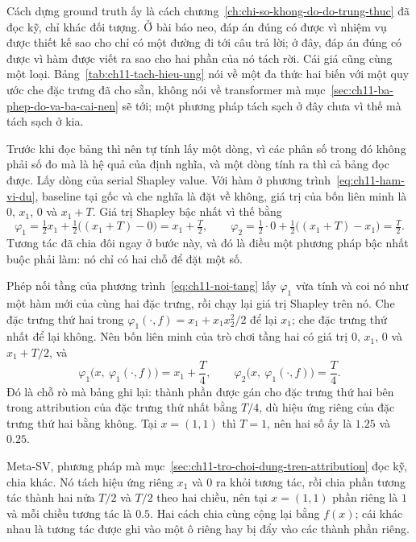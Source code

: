 Cách dựng ground truth ấy là cách chương~\ref{ch:chi-so-khong-do-do-trung-thuc}
đã đọc kỹ, chỉ khác đối tượng. Ở bài báo neo, đáp án đúng có được vì nhiệm vụ
được thiết kế sao cho chỉ có một đường đi tới câu trả lời; ở đây, đáp án đúng có
được vì hàm được viết ra sao cho hai phần của nó tách rời. Cái giá cũng cùng một
loại. Bảng~\ref{tab:ch11-tach-hieu-ung} nói về một đa thức hai biến với một quy
ước che đặc trưng đã cho sẵn, không nói về transformer mà mục~\ref{sec:ch11-ba-phep-do-va-ba-cai-nen}
sẽ tới; một phương pháp tách sạch ở đây chưa vì thế mà tách sạch ở kia.

Trước khi đọc bảng thì nên tự tính lấy một dòng, vì các phân số trong đó không
phải số đo mà là hệ quả của định nghĩa, và một dòng tính ra thì cả bảng đọc
được. Lấy dòng của serial Shapley value. Với hàm ở
phương trình~\ref{eq:ch11-ham-vi-du}, baseline tại gốc và che nghĩa là đặt về
không, giá trị của bốn liên minh là $0$, $x_1$, $0$ và $x_1 + T$. Giá trị
Shapley bậc nhất vì thế bằng
\[
  \varphi_1 = \tfrac{1}{2}x_1 + \tfrac{1}{2}\big((x_1+T) - 0\big) = x_1 + \tfrac{T}{2},
  \qquad
  \varphi_2 = \tfrac{1}{2}\cdot 0 + \tfrac{1}{2}\big((x_1+T) - x_1\big) = \tfrac{T}{2} .
\]
Tương tác đã chia đôi ngay ở bước này, và đó là điều một phương pháp bậc nhất
buộc phải làm: nó chỉ có hai chỗ để đặt một số.

Phép nối tầng của phương trình~\ref{eq:ch11-noi-tang} lấy $\varphi_1$ vừa tính
và coi nó như một hàm mới của cùng hai đặc trưng, rồi chạy lại giá trị Shapley
trên nó. Che đặc trưng thứ hai trong
$\varphi_1(\cdot,f) = x_1 + x_1x_2^2/2$ để lại $x_1$; che đặc trưng thứ nhất để
lại không. Nên bốn liên minh của trò chơi tầng hai có giá trị $0$, $x_1$, $0$ và
$x_1 + T/2$, và
\[
  \varphi_1\bigl(x,\ \varphi_1(\cdot,f)\bigr) = x_1 + \frac{T}{4},
  \qquad
  \varphi_2\bigl(x,\ \varphi_1(\cdot,f)\bigr) = \frac{T}{4} .
\]
Đó là chỗ rò mà bảng ghi lại: thành phần được gán cho đặc trưng thứ hai bên
trong attribution của đặc trưng thứ nhất bằng $T/4$, dù hiệu ứng riêng của đặc
trưng thứ hai bằng không. Tại $x = (1,1)$ thì $T = 1$, nên hai số ấy là $1.25$
và $0.25$.

Meta-SV, phương pháp mà mục~\ref{sec:ch11-tro-choi-dung-tren-attribution} đọc
kỹ, chia khác. Nó tách hiệu ứng riêng $x_1$ và $0$ ra khỏi tương tác, rồi
chia phần tương tác thành hai nửa $T/2$ và $T/2$ theo hai chiều, nên tại
$x = (1,1)$ phần riêng là $1$ và mỗi chiều tương tác là $0.5$. Hai cách chia
cùng cộng lại bằng $f(x)$; cái khác nhau là tương tác được ghi vào một ô riêng
hay bị đẩy vào các thành phần riêng.

